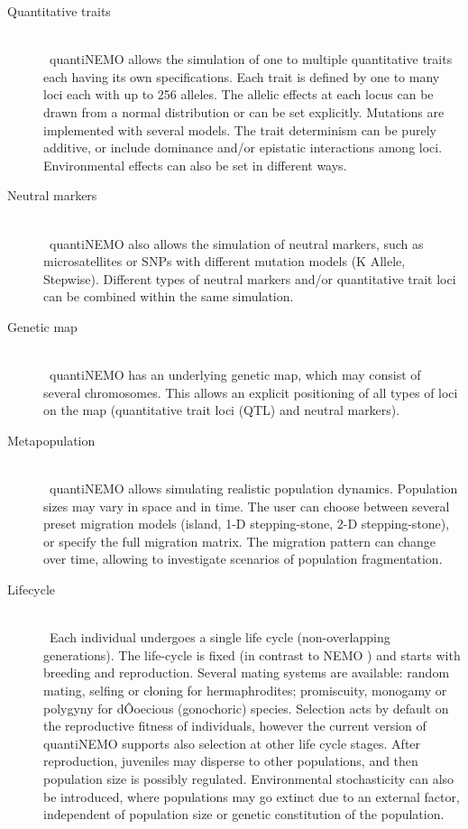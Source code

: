 \documentclass[letterpaper,12pt,oneside]{book}
\begin{document}
\begin{description}
\item[Quantitative traits]\hspace*{\fill}\\\
quantiNEMO allows the simulation of one to multiple quantitative traits each having its own specifications. Each trait is defined by one to many loci each with up to 256 alleles. The allelic effects at each locus can be drawn from a normal distribution or can be set explicitly. Mutations are implemented with several models. The trait determinism can be purely additive, or include dominance and/or epistatic interactions among loci. Environmental effects can also be set in different ways. 

\item[Neutral markers]\hspace*{\fill}\\\
quantiNEMO also allows the simulation of neutral markers, such as microsatellites or SNPs with different mutation models (K Allele, Stepwise).
Different types of neutral markers and/or quantitative trait loci can be combined within the same simulation.

\item[Genetic map]\hspace*{\fill}\\\
quantiNEMO has an underlying genetic map, which may consist of several chromosomes. This allows an explicit positioning of all types of loci on the map (quantitative trait loci (QTL) and neutral markers). 

\item[Metapopulation]\hspace*{\fill}\\\
quantiNEMO allows simulating realistic population dynamics. Population sizes may vary in space and in time. The user can choose between several preset migration models (island, 1-D stepping-stone, 2-D stepping-stone), or specify the full migration matrix. The migration pattern can change over time, allowing to investigate scenarios of population fragmentation.

\item[Lifecycle]\hspace*{\fill}\\\
Each individual undergoes a single life cycle (non-overlapping generations). The life-cycle is fixed (in contrast to NEMO \citep{Guillaume_2006}) and starts with breeding and reproduction. Several mating systems are available: random mating, selfing or cloning for hermaphrodites; promiscuity, monogamy or polygyny for dÔoecious (gonochoric) species. Selection acts by default on the reproductive fitness of individuals, however the current version of quantiNEMO supports also selection at other life cycle stages. After reproduction, juveniles may disperse to other populations, and then population size is possibly regulated. Environmental stochasticity can also be introduced, where populations may go extinct due to an external factor, independent of population size or genetic constitution of the population.


\end{description}
\end{document}
